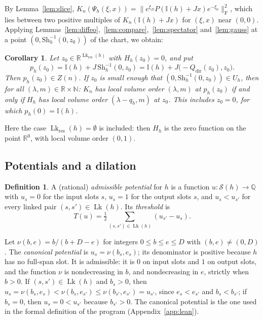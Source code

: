 \documentclass[11pt,a4paper]{article}
\newtheorem{corollary}[theorem]{Corollary}
\theoremstyle{definition}
\newtheorem{definition}[theorem]{Definition}
\theoremstyle{remark}
\numberwithin{equation}{section}
\newcommand{\N}{\mathbb{N}}
\newcommand{\Q}{\mathbb{Q}}
\newcommand{\R}{\mathbb{R}}
\newcommand{\Fr}[1]{\lVert #1\rVert_{\mathrm F}}
\newcommand{\I}{\mathbb I}
\newcommand{\Sl}{\mathcal S}
\newcommand{\Lk}{\operatorname{Lk}}
\begin{document}
By Lemma~\ref{lem:slice}, $K_n(\Psi_h(\xi,x))=\Fr{e^{\xi_D}P(\I(h)+Jx)e^{-\xi_0}}^2$, which lies between two positive multiples of $K_n(\I(h)+Jx)$ for $(\xi,x)$ near $(0,0)$. Applying Lemmas~\ref{lem:diffeo},~\ref{lem:compare},~\ref{lem:spectator} and~\ref{lem:gauss} at a point $(0,\mathrm{Sh}_h^{-1}(0,z_0))$ of the chart, we obtain:

\begin{corollary}\label{cor:H}
Let $z_0\in\R^{\Lk_{\mathrm{res}}(h)}$ with $H_h(z_0)=0$, and put
\[
p_h(z_0)=\I(h)+J\,\mathrm{Sh}_h^{-1}(0,z_0)=\I(h)+J\bigl(-Q_{\mathrm{dir}}(z_0),z_0\bigr).
\]
Then $p_h(z_0)\in Z(n)$. If $z_0$ is small enough that $(0,\mathrm{Sh}_h^{-1}(0,z_0))\in U_h$, then for all $(\lambda,m)\in\R\times\N$: $K_n$ has local volume order $(\lambda,m)$ at $p_h(z_0)$ if and only if $H_h$ has local volume order $(\lambda-q_h,m)$ at $z_0$. This includes $z_0=0$, for which $p_h(0)=\I(h)$.
\end{corollary}
Here the case $\Lk_{\mathrm{res}}(h)=\emptyset$ is included: then $H_h$ is the zero function on the point $\R^0$, with local volume order $(0,1)$.

\subsection{Potentials and a dilation}
\begin{definition}\label{def:potential}
A (rational) \emph{admissible potential} for $h$ is a function $u:\Sl(h)\to\Q$ with $u_s=0$ for the input slots $s$, $u_s=1$ for the output slots $s$, and $u_s<u_{s'}$ for every linked pair $(s,s')\in\Lk(h)$. Its \emph{threshold} is
\[
T(u)=\tfrac12\sum_{(s,s')\in\Lk(h)}(u_{s'}-u_s).
\]
\end{definition}
Let $\nu(b,e)=b/(b+D-e)$ for integers $0\le b\le e\le D$ with $(b,e)\neq(0,D)$. The \emph{canonical potential} is $u_s=\nu(b_s,e_s)$; its denominator is positive because $h$ has no full-span slot. It is admissible: it is $0$ on input slots and $1$ on output slots, and the function $\nu$ is nondecreasing in $b$, and nondecreasing in $e$, strictly when $b>0$. If $(s,s')\in\Lk(h)$ and $b_s>0$, then $u_s=\nu(b_s,e_s)<\nu(b_s,e_{s'})\le\nu(b_{s'},e_{s'})=u_{s'}$, since $e_s<e_{s'}$ and $b_s<b_{s'}$; if $b_s=0$, then $u_s=0<u_{s'}$ because $b_{s'}>0$. The canonical potential is the one used in the formal definition of the program (Appendix~\ref{app:lean}).
\end{document}

